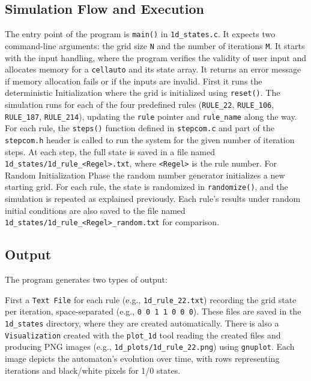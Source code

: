 \documentclass[12pt,a4paper]{article}
\begin{document}
\subsection*{\small Simulation Flow and Execution}
The entry point of the program is \texttt{main()} in \texttt{1d\_states.c}. It expects two command-line arguments: the grid size \texttt{N} and the 
number of iterations \texttt{M}. It starts with the input handling, where the program verifies the validity of user input and 
allocates memory for a \texttt{cellauto} and its state array. It returns an error message if memory allocation fails or 
if the inputs are invalid.
\newline
First it runs the deterministic Initialization where the grid is initialized using \texttt{reset()}. The simulation runs for each 
of the four predefined rules (\texttt{RULE\_22}, \texttt{RULE\_106}, \texttt{RULE\_187}, \texttt{RULE\_214}), updating the \texttt{rule} pointer and 
\texttt{rule\_name} along the way. For each rule, the \texttt{steps()} function defined in \texttt{stepcom.c} and part of the \texttt{stepcom.h} header
 is called to run the system for the given number of iteration steps.  At each step, the full state is saved in a file named 
\texttt{1d\_states/1d\_rule\_<Regel>.txt}, where \texttt{<Regel>} is the rule number.
\newline
For Random Initialization Phase the random number generator initializes a new starting grid. For each rule, the state is 
randomized in \texttt{randomize()}, and the simulation is repeated as explained previously. Each rule’s results under random initial 
conditions are also saved to the file named 
\newline
\texttt{1d\_states/1d\_rule\_<Regel>\_random.txt} for comparison.
\newline

\vspace{1cm}


\subsection{Output}
The program generates two types of output:
\newline
\vspace{0.1 cm}

First a \texttt{Text File} for each rule (e.g., \texttt{1d\_rule\_22.txt}) recording the grid state per iteration, 
space-separated (e.g., \texttt{0 0 1 1 0 0 0}). 
These files are saved in the \texttt{1d\_states} directory, where they are created automatically.
\newline
There is also a \texttt{Visualization} created with the \texttt{plot\_1d} tool reading the created files and producing 
PNG images (e.g., \texttt{1d\_plots/1d\_rule\_22.png}) using \texttt{gnuplot}. Each image depicts the automaton's evolution 
over time, with rows representing iterations and black/white pixels for 1/0 states.
\newline
\vspace{0.1 cm}
\end{document}
